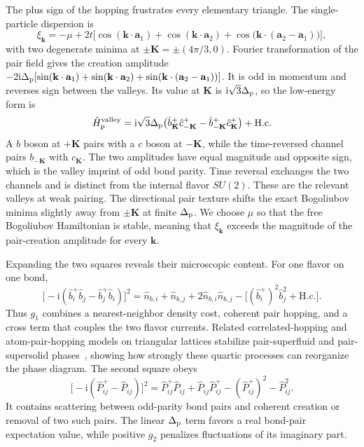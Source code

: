 \documentclass[onecolumn,aps,prb,amsmath,amssymb,superscriptaddress,longbibliography]{revtex4-2}
\newcommand{\ii}{\mathrm{i}}
\begin{document}
The plus sign of the hopping frustrates every elementary triangle.  The single-particle dispersion is
\begin{equation}
    \xi_{\mathbf k}=-\mu+2t\bigl[\cos(\mathbf k\!\cdot\!\mathbf a_1)+\cos(\mathbf k\!\cdot\!\mathbf a_2)+\cos\bigl(\mathbf k\!\cdot\!(\mathbf a_2-\mathbf a_1)\bigr)\bigr],
    \label{eq:three_plus_dispersion}
\end{equation}
with two degenerate minima at \(\pm\mathbf K=\pm(4\pi/3,0)\).  Fourier transformation of the pair field gives the creation amplitude \(-2\ii\Delta_{\rm p}[\sin(\mathbf k\cdot\mathbf a_1)+\sin(\mathbf k\cdot\mathbf a_2)+\sin(\mathbf k\cdot(\mathbf a_2-\mathbf a_1))]\).  It is odd in momentum and reverses sign between the valleys.  Its value at \(\mathbf K\) is \(\ii\sqrt{3}\Delta_{\rm p}\), so the low-energy form is
\begin{equation}
    \hat H_{\rm p}^{\rm valley}=\ii\sqrt{3}\Delta_{\rm p}\bigl(\hat b_{\mathbf K}^+\hat c_{-\mathbf K}^+-\hat b_{-\mathbf K}^+\hat c_{\mathbf K}^+\bigr)+\mathrm{H.c.}
    \label{eq:three_plus_pair_form_factor}
\end{equation}
A \(b\) boson at \(+\mathbf K\) pairs with a \(c\) boson at \(-\mathbf K\), while the time-reversed channel pairs \(b_{-\mathbf K}\) with \(c_{\mathbf K}\).  The two amplitudes have equal magnitude and opposite sign, which is the valley imprint of odd bond parity.  Time reversal exchanges the two channels and is distinct from the internal flavor \(SU(2)\).  These are the relevant valleys at weak pairing.  The directional pair texture shifts the exact Bogoliubov minima slightly away from \(\pm\mathbf K\) at finite \(\Delta_{\rm p}\).  We choose \(\mu\) so that the free Bogoliubov Hamiltonian is stable, meaning that \(\xi_{\mathbf k}\) exceeds the magnitude of the pair-creation amplitude for every \(\mathbf k\).

Expanding the two squares reveals their microscopic content.  For one flavor on one bond,
\begin{equation}
    \bigl[-\ii(\hat b_i^+\hat b_j-\hat b_j^+\hat b_i)\bigr]^2=\hat n_{b,i}+\hat n_{b,j}+2\hat n_{b,i}\hat n_{b,j}-\bigl[(\hat b_i^+)^2\hat b_j^2+\mathrm{H.c.}\bigr].
    \label{eq:three_plus_current_square_expansion}
\end{equation}
Thus \(g_1\) combines a nearest-neighbor density cost, coherent pair hopping, and a cross term that couples the two flavor currents.  Related correlated-hopping and atom-pair-hopping models on triangular lattices stabilize pair-superfluid and pair-supersolid phases~\cite{jiangFuXu2012,zhangYinWang2013pair}, showing how strongly these quartic processes can reorganize the phase diagram.  The second square obeys
\begin{equation}
    \bigl[-\ii(\hat P_{ij}^+-\hat P_{ij})\bigr]^2=\hat P_{ij}^+\hat P_{ij}+\hat P_{ij}\hat P_{ij}^+-(\hat P_{ij}^+)^2-\hat P_{ij}^2.
    \label{eq:three_plus_pair_square_expansion}
\end{equation}
It contains scattering between odd-parity bond pairs and coherent creation or removal of two such pairs.  The linear \(\Delta_{\rm p}\) term favors a real bond-pair expectation value, while positive \(g_2\) penalizes fluctuations of its imaginary part.
\end{document}
